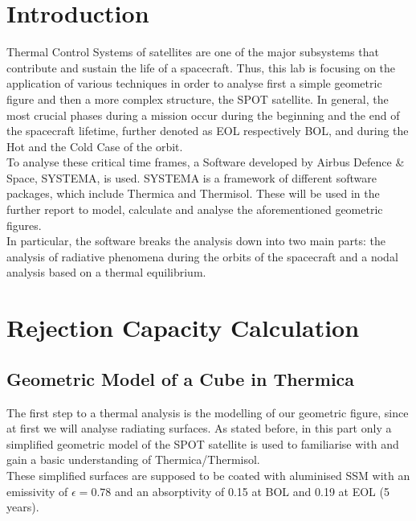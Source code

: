 \section{Introduction}
Thermal Control Systems of satellites are one of the major subsystems that contribute and sustain the life of a spacecraft. Thus, this lab is focusing on the application of various techniques in order to analyse first a simple geometric figure and then a more complex structure, the SPOT satellite. In general, the most crucial phases during a mission occur during the beginning and the end of the spacecraft lifetime, further denoted as EOL respectively BOL, and during the Hot and the Cold Case of the orbit.\\
To analyse these critical time frames, a Software developed by Airbus Defence \& Space, SYSTEMA, is used. SYSTEMA is a framework of different software packages, which include Thermica and Thermisol. These will be used in the further report to model, calculate and analyse the aforementioned geometric figures. \\In particular, the software breaks the analysis down into two main parts: the analysis of radiative phenomena during the orbits of the spacecraft and a nodal analysis based on a thermal equilibrium.

\section{Rejection Capacity Calculation}
\subsection{Geometric Model of a Cube in Thermica}
The first step to a thermal analysis is the modelling of our geometric figure, since at first we will analyse radiating surfaces. As stated before, in this part only a simplified geometric model of the SPOT satellite is used to familiarise with and gain a basic understanding of Thermica/Thermisol.\\
These simplified surfaces are supposed to be coated with aluminised SSM with an emissivity of $\epsilon = 0.78$ and an absorptivity of 0.15 at BOL and 0.19 at EOL (5 years).
 

